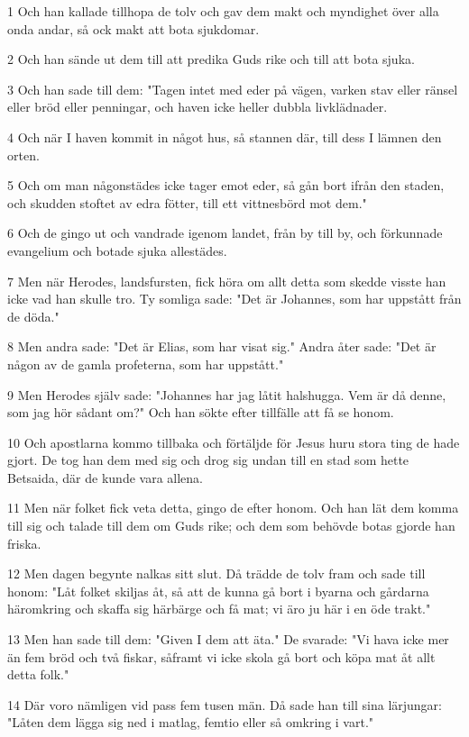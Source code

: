 \par 1 Och han kallade tillhopa de tolv och gav dem makt och myndighet över alla onda andar, så ock makt att bota sjukdomar.
\par 2 Och han sände ut dem till att predika Guds rike och till att bota sjuka.
\par 3 Och han sade till dem: "Tagen intet med eder på vägen, varken stav eller ränsel eller bröd eller penningar, och haven icke heller dubbla livklädnader.
\par 4 Och när I haven kommit in något hus, så stannen där, till dess I lämnen den orten.
\par 5 Och om man någonstädes icke tager emot eder, så gån bort ifrån den staden, och skudden stoftet av edra fötter, till ett vittnesbörd mot dem."
\par 6 Och de gingo ut och vandrade igenom landet, från by till by, och förkunnade evangelium och botade sjuka allestädes.
\par 7 Men när Herodes, landsfursten, fick höra om allt detta som skedde visste han icke vad han skulle tro. Ty somliga sade: "Det är Johannes, som har uppstått från de döda."
\par 8 Men andra sade: "Det är Elias, som har visat sig." Andra åter sade: "Det är någon av de gamla profeterna, som har uppstått."
\par 9 Men Herodes själv sade: "Johannes har jag låtit halshugga. Vem är då denne, som jag hör sådant om?" Och han sökte efter tillfälle att få se honom.
\par 10 Och apostlarna kommo tillbaka och förtäljde för Jesus huru stora ting de hade gjort. De tog han dem med sig och drog sig undan till en stad som hette Betsaida, där de kunde vara allena.
\par 11 Men när folket fick veta detta, gingo de efter honom. Och han lät dem komma till sig och talade till dem om Guds rike; och dem som behövde botas gjorde han friska.
\par 12 Men dagen begynte nalkas sitt slut. Då trädde de tolv fram och sade till honom: "Låt folket skiljas åt, så att de kunna gå bort i byarna och gårdarna häromkring och skaffa sig härbärge och få mat; vi äro ju här i en öde trakt."
\par 13 Men han sade till dem: "Given I dem att äta." De svarade: "Vi hava icke mer än fem bröd och två fiskar, såframt vi icke skola gå bort och köpa mat åt allt detta folk."
\par 14 Där voro nämligen vid pass fem tusen män. Då sade han till sina lärjungar: "Låten dem lägga sig ned i matlag, femtio eller så omkring i vart."
